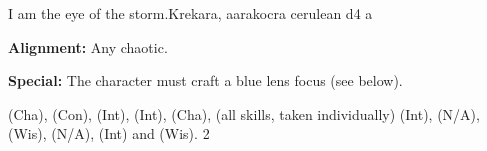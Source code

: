 {I am the eye of the storm.}{Krekara, aarakocra cerulean}
{
}
{d4}
{a}
{
}
{
\textbf{Alignment:} Any chaotic.




\textbf{Special:} The character must craft a blue lens focus (see below).
}
{ (Cha),  (Con),  (Int),  (Int),  (Cha),  (all skills, taken individually) (Int),  (N/A),  (Wis),  (N/A),  (Int) and  (Wis).}
{2}
